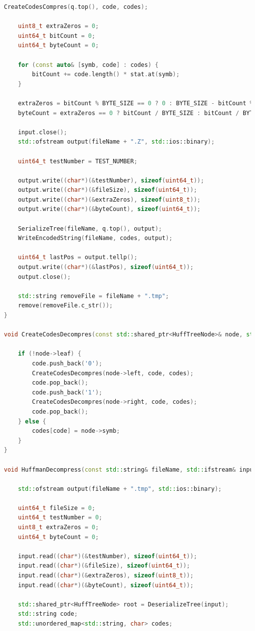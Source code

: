 \documentclass[14pt]{article}
\begin{document}
\begin{lstlisting}[language=C++]
    CreateCodesCompres(q.top(), code, codes);

    uint8_t extraZeros = 0;
    uint64_t bitCount = 0;
    uint64_t byteCount = 0;

    for (const auto& [symb, code] : codes) {
        bitCount += code.length() * stat.at(symb);
    }

    extraZeros = bitCount % BYTE_SIZE == 0 ? 0 : BYTE_SIZE - bitCount % BYTE_SIZE;
    byteCount = extraZeros == 0 ? bitCount / BYTE_SIZE : bitCount / BYTE_SIZE + 1;

    input.close();
    std::ofstream output(fileName + ".Z", std::ios::binary);

    uint64_t testNumber = TEST_NUMBER;

    output.write((char*)(&testNumber), sizeof(uint64_t));
    output.write((char*)(&fileSize), sizeof(uint64_t));
    output.write((char*)(&extraZeros), sizeof(uint8_t));
    output.write((char*)(&byteCount), sizeof(uint64_t));

    SerializeTree(fileName, q.top(), output);
    WriteEncodedString(fileName, codes, output);

    uint64_t lastPos = output.tellp();
    output.write((char*)(&lastPos), sizeof(uint64_t));
    output.close();

    std::string removeFile = fileName + ".tmp";
    remove(removeFile.c_str());
}

void CreateCodesDecompres(const std::shared_ptr<HuffTreeNode>& node, std::string& code, std::unordered_map<std::string, char>& codes) {

    if (!node->leaf) {
        code.push_back('0');
        CreateCodesDecompres(node->left, code, codes);
        code.pop_back();
        code.push_back('1');
        CreateCodesDecompres(node->right, code, codes);
        code.pop_back();
    } else {
        codes[code] = node->symb;
    }
}

void HuffmanDecompress(const std::string& fileName, std::ifstream& input) {

    std::ofstream output(fileName + ".tmp", std::ios::binary);

    uint64_t fileSize = 0;
    uint64_t testNumber = 0;
    uint8_t extraZeros = 0;
    uint64_t byteCount = 0;

    input.read((char*)(&testNumber), sizeof(uint64_t));
    input.read((char*)(&fileSize), sizeof(uint64_t));
    input.read((char*)(&extraZeros), sizeof(uint8_t));
    input.read((char*)(&byteCount), sizeof(uint64_t));

    std::shared_ptr<HuffTreeNode> root = DeserializeTree(input);
    std::string code;
    std::unordered_map<std::string, char> codes;


\end{lstlisting}
\end{document}
